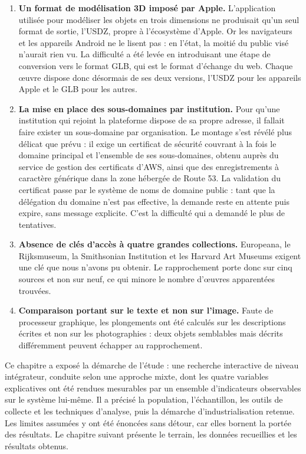 \begin{enumerate}
  \item \textbf{Un format de modélisation 3D imposé par Apple.} L'application
        utilisée pour modéliser les objets en trois dimensions ne produisait
        qu'un seul format de sortie, l'USDZ, propre à l'écosystème d'Apple. Or
        les navigateurs et les appareils Android ne le lisent pas : en l'état,
        la moitié du public visé n'aurait rien vu. La difficulté a été levée en
        introduisant une étape de conversion vers le format GLB, qui est le
        format d'échange du web. Chaque œuvre dispose donc désormais de ses deux
        versions, l'USDZ pour les appareils Apple et le GLB pour les autres.

  \item \textbf{La mise en place des sous-domaines par institution.} Pour qu'une
        institution qui rejoint la plateforme dispose de sa propre adresse, il
        fallait faire exister un sous-domaine par organisation. Le montage s'est
        révélé plus délicat que prévu : il exige un certificat de sécurité
        couvrant à la fois le domaine principal et l'ensemble de ses
        sous-domaines, obtenu auprès du service de gestion des certificats
        d'AWS, ainsi que des enregistrements à caractère générique dans la zone
        hébergée de Route 53. La validation du certificat passe par le système
        de noms de domaine public : tant que la délégation du domaine n'est pas
        effective, la demande reste en attente puis expire, sans message
        explicite. C'est la difficulté qui a demandé le plus de tentatives.

  \item \textbf{Absence de clés d'accès à quatre grandes collections.} Europeana,
        le Rijksmuseum, la Smithsonian Institution et les Harvard Art Museums
        exigent une clé que nous n'avons pu obtenir. Le rapprochement porte donc
        sur cinq sources et non sur neuf, ce qui minore le nombre d'œuvres
        apparentées trouvées.

  \item \textbf{Comparaison portant sur le texte et non sur l'image.} Faute de
        processeur graphique, les plongements ont été calculés sur les
        descriptions écrites et non sur les photographies : deux objets
        semblables mais décrits différemment peuvent échapper au rapprochement.
\end{enumerate}

\conclchap

Ce chapitre a exposé la démarche de l'étude : une recherche interactive de
niveau intégrateur, conduite selon une approche mixte, dont les quatre variables
explicatives ont été rendues mesurables par un ensemble d'indicateurs
observables sur le système lui-même. Il a précisé la population, l'échantillon,
les outils de collecte et les techniques d'analyse, puis la démarche
d'industrialisation retenue. Les limites assumées y ont été énoncées sans
détour, car elles bornent la portée des résultats. Le chapitre suivant présente
le terrain, les données recueillies et les résultats obtenus.
